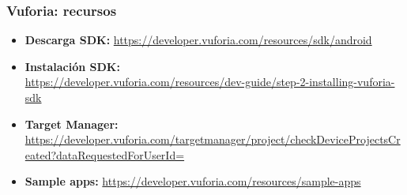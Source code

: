 \frame
{
\frametitle{Vuforia: recursos}
\begin{itemize}
\item \textbf{Descarga SDK:} \url{https://developer.vuforia.com/resources/sdk/android}
\item \textbf{Instalación SDK:} \\\url{https://developer.vuforia.com/resources/dev-guide/step-2-installing-vuforia-sdk}
\item \textbf{Target Manager:} \url{https://developer.vuforia.com/targetmanager/project/checkDeviceProjectsCreated?dataRequestedForUserId=}
\item \textbf{Sample apps:} \url{https://developer.vuforia.com/resources/sample-apps}
\end{itemize}
}

